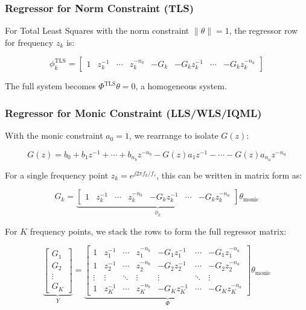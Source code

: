 \subsubsection{Regressor for Norm Constraint (TLS)}

For Total Least Squares with the norm constraint $\|\theta\|=1$, the regressor row for frequency $z_k$ is:

\begin{equation}
    \phi_k^{\text{TLS}} = \begin{bmatrix} 1 & z_k^{-1} & \cdots & z_k^{-n_b} & -G_k & -G_k z_k^{-1} & \cdots & -G_k z_k^{-n_a} \end{bmatrix}
\end{equation}

The full system becomes $\Phi^{\text{TLS}} \theta = 0$, a homogeneous system.

\subsubsection{Regressor for Monic Constraint (LLS/WLS/IQML)}

With the monic constraint $a_0 = 1$, we rearrange to isolate $G(z)$:

\begin{equation}
    G(z) = b_0 + b_1 z^{-1} + \cdots + b_{n_b} z^{-n_b} - G(z) a_1 z^{-1} - \cdots - G(z) a_{n_a} z^{-n_a}
\end{equation}

For a single frequency point $z_k = e^{j 2\pi f_k / f_s}$, this can be written in matrix form as:

\begin{equation}
    G_k = \underbrace{\begin{bmatrix} 1 & z_k^{-1} & \cdots & z_k^{-n_b} & -G_k z_k^{-1} & \cdots & -G_k z_k^{-n_a} \end{bmatrix}}_{\phi_k} \theta_{\text{monic}}
\end{equation}

For $K$ frequency points, we stack the rows to form the full regressor matrix:

\begin{equation}
    \underbrace{\begin{bmatrix} G_1 \\ G_2 \\ \vdots \\ G_K \end{bmatrix}}_{Y} = \underbrace{\begin{bmatrix} 
    1 & z_1^{-1} & \cdots & z_1^{-n_b} & -G_1 z_1^{-1} & \cdots & -G_1 z_1^{-n_a} \\ 
    1 & z_2^{-1} & \cdots & z_2^{-n_b} & -G_2 z_2^{-1} & \cdots & -G_2 z_2^{-n_a} \\ 
    \vdots & \vdots & \ddots & \vdots & \vdots & \ddots & \vdots \\ 
    1 & z_K^{-1} & \cdots & z_K^{-n_b} & -G_K z_K^{-1} & \cdots & -G_K z_K^{-n_a} 
    \end{bmatrix}}_{\Phi} \theta_{\text{monic}}
    \label{eq:regressor_matrix}
\end{equation}

